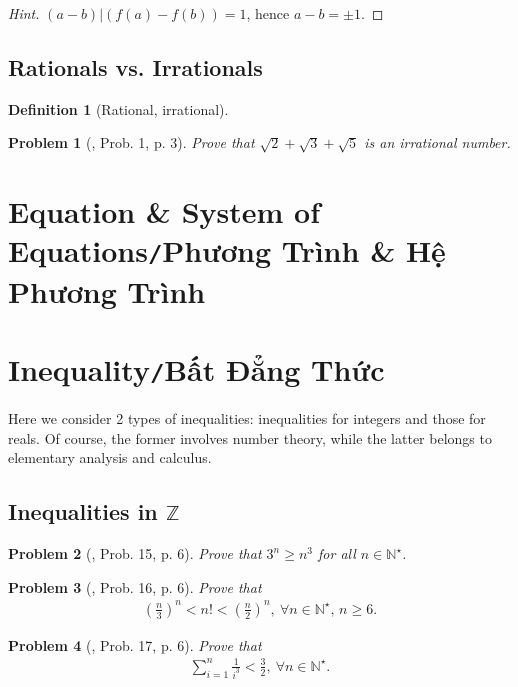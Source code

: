 \documentclass[oneside]{book}
\numberwithin{equation}{section}
\newtheorem{definition}{Definition}[section]
\newtheorem{problem}{Problem}[section]
\begin{document}
\begin{proof}[Hint]
	$(a - b)|(f(a) - f(b)) = 1$, hence $a - b = \pm 1$.
\end{proof}

\subsection{Rationals vs. Irrationals}
\begin{definition}[Rational, irrational]
	
\end{definition}
\begin{problem}[\cite{Gelca_Andreescu2017}, Prob. 1, p. 3]
	Prove that $\sqrt{2} + \sqrt{3} + \sqrt{5}$ is an irrational number.
\end{problem}

\section{Equation \& System of Equations\texttt{/}Phương Trình \& Hệ Phương Trình}

\section{Inequality\texttt{/}Bất Đẳng Thức}
Here we consider 2 types of inequalities: inequalities for integers and those for reals. Of course, the former involves number theory, while the latter belongs to elementary analysis and calculus.

\subsection{Inequalities in $\mathbb{Z}$}
\begin{problem}[\cite{Gelca_Andreescu2017}, Prob. 15, p. 6]
	Prove that $3^n\ge n^3$  for all $n\in\mathbb{N}^\star$.
\end{problem}

\begin{problem}[\cite{Gelca_Andreescu2017}, Prob. 16, p. 6]
	Prove that
	\begin{align*}
		\left(\frac{n}{3}\right)^n < n! < \left(\frac{n}{2}\right)^n,\ \forall n\in\mathbb{N}^\star,\,n\ge 6.
	\end{align*}
\end{problem}

\begin{problem}[\cite{Gelca_Andreescu2017}, Prob. 17, p. 6]
	Prove that
	\begin{align*}
		\sum_{i=1}^n \frac{1}{i^3} < \frac{3}{2},\ \forall n\in\mathbb{N}^\star.
	\end{align*}
\end{problem}
\end{document}
